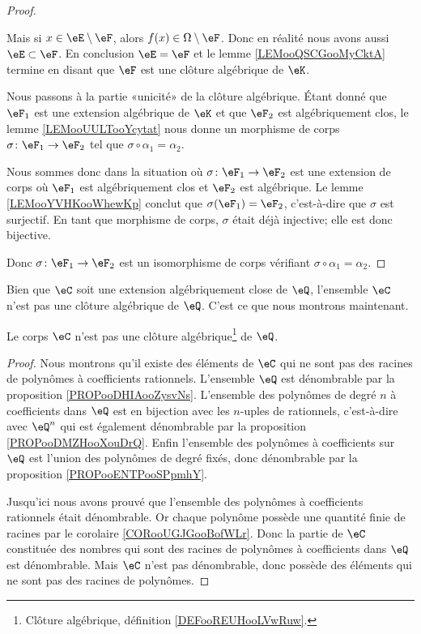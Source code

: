 \begin{proof}
\begin{subproof}
		Mais si \( x\in\eE\setminus \eF\), alors \( f(x)\in \Omega\setminus \eF\). Donc en réalité nous avons aussi \( \eE\subset \eF\).
		\spitem[Conclusion]
		En conclusion \( \eE=\eF\) et le lemme \ref{LEMooQSCGooMyCktA} termine en disant que \( \eF\) est une clôture algébrique de \( \eK\).
	\end{subproof}
	Nous passons à la partie «unicité» de la clôture algébrique. Étant donné que \( \eF_1\) est une extension algébrique de \( \eK\) et que \( \eF_2\) est algébriquement clos, le lemme \ref{LEMooUULTooYcytat} nous donne un morphisme de corps \( \sigma\colon \eF_1\to \eF_2\) tel que \( \sigma\circ \alpha_1=\alpha_2\).

	Nous sommes donc dans la situation où \( \sigma\colon \eF_1\to \eF_2\) est une extension de corps où \( \eF_1\) est algébriquement clos et \( \eF_2\) est algébrique. Le lemme \ref{LEMooYVHKooWhewKp} conclut que \( \sigma(\eF_1)=\eF_2\), c'est-à-dire que \( \sigma\) est surjectif. En tant que morphisme de corps, \( \sigma\) était déjà injective; elle est donc bijective.

	Donc \( \sigma\colon \eF_1\to \eF_2\) est un isomorphisme de corps vérifiant \( \sigma\circ \alpha_1=\alpha_2\).
\end{proof}

\begin{normaltext}
	Bien que \( \eC\) soit une extension algébriquement close de \( \eQ\), l'ensemble \( \eC\) n'est pas une clôture algébrique de \( \eQ\). C'est ce que nous montrons maintenant.
\end{normaltext}

\begin{lemma}       \label{LEMooRDIZooRjWNMa}
	Le corps \( \eC\) n'est pas une clôture algébrique\footnote{Clôture algébrique, définition \ref{DEFooREUHooLVwRuw}.} de \( \eQ\).
\end{lemma}

\begin{proof}
	Nous montrons qu'il existe des éléments de \( \eC\) qui ne sont pas des racines de polynômes à coefficients rationnels. L'ensemble \( \eQ\) est dénombrable par la proposition \ref{PROPooDHIAooZysvNs}. L'ensemble des polynômes de degré \( n\) à coefficients dans \( \eQ\) est en bijection avec les \( n\)-uples de rationnels, c'est-à-dire avec \( \eQ^n\) qui est également dénombrable par la proposition \ref{PROPooDMZHooXouDrQ}. Enfin l'ensemble des polynômes à coefficients sur \( \eQ\) est l'union des polynômes de degré fixés, donc dénombrable par la proposition \ref{PROPooENTPooSPpmhY}.

	Jusqu'ici nous avons prouvé que l'ensemble des polynômes à coefficients rationnels était dénombrable. Or chaque polynôme possède une quantité finie de racines par le corolaire \ref{CORooUGJGooBofWLr}. Donc la partie de \( \eC\) constituée des nombres qui sont des racines de polynômes à coefficients dans \( \eQ\) est dénombrable. Mais \( \eC\) n'est pas dénombrable, donc possède des éléments qui ne sont pas des racines de polynômes.
\end{proof}

